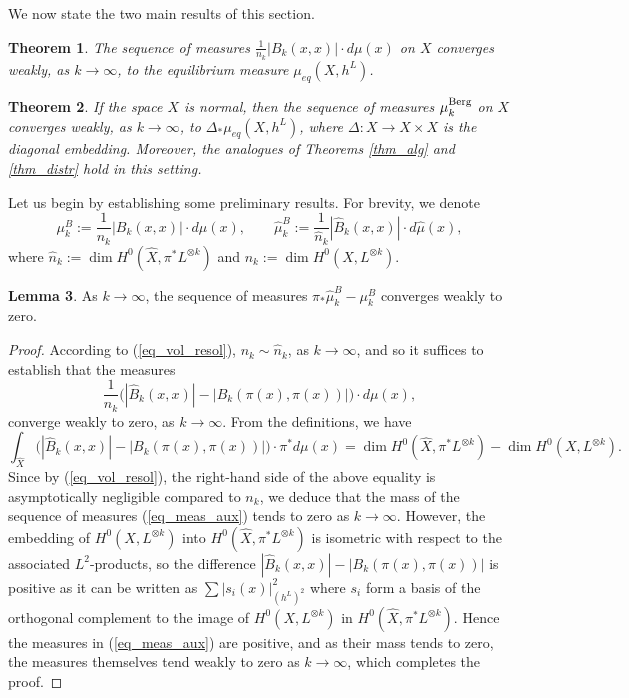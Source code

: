 \documentclass[12pt]{article}
\numberwithin{equation}{section}
\theoremstyle{theorem}
\newtheorem{thm}{Theorem}[section]
\theoremstyle{definition}
\newtheorem{lem}[thm]{Lemma}
\theoremstyle{remark}
\begin{document}
	We now state the two main results of this section.
	\par 
	\begin{thm}\label{thm_sing0}
		The sequence of measures $\frac{1}{n_k} |B_k(x, x)| \cdot d \mu(x)$ on $X$ converges weakly, as $k \to \infty$, to the equilibrium measure $\mu_{eq}(X, h^L)$.
	\end{thm}
	\begin{thm}\label{thm_sing}
		If the space $X$ is normal, then the sequence of measures $\mu_k^{\rm{Berg}}$ on $X$ converges weakly, as $k \to \infty$, to $\Delta_* \mu_{eq}(X, h^L)$, where $\Delta: X \to X \times X$ is the diagonal embedding.
		Moreover, the analogues of Theorems \ref{thm_alg} and \ref{thm_distr} hold in this setting.
	\end{thm}
	Let us begin by establishing some preliminary results.
	For brevity, we denote 
	\begin{equation}
		\mu_k^B := \frac{1}{n_k} |B_k(x, x)| \cdot d \mu(x), \qquad \hat{\mu}_k^B := \frac{1}{\hat{n}_k} |\hat{B}_k(x, x)| \cdot d \hat{\mu}(x),
	\end{equation}
	where $\hat{n}_k := \dim H^0(\hat{X}, \pi^* L^{\otimes k})$ and $n_k := \dim H^0(X, L^{\otimes k})$.
	\begin{lem}\label{lem_comp_res_meas}
		As $k \to \infty$, the sequence of measures $\pi_* \hat{\mu}_k^B - \mu_k^B$ converges weakly to zero.
	\end{lem}
	\begin{proof}
		According to (\ref{eq_vol_resol}), $n_k \sim \hat{n}_k$, as $k \to \infty$, and so it suffices to establish that the measures
		\begin{equation}\label{eq_meas_aux}
			\frac{1}{n_k} \Big( |\hat{B}_k(x, x)| - |B_k(\pi(x), \pi(x))| \Big) \cdot d \mu(x),
		\end{equation}
		converge weakly to zero, as $k \to \infty$.
		From the definitions, we have 
		\begin{equation}
			\int_{\hat{X}}  \Big( |\hat{B}_k(x, x)| - |B_k(\pi(x), \pi(x))| \Big) \cdot \pi^* d \mu(x)
			=
			\dim H^0(\hat{X}, \pi^* L^{\otimes k})
			-
			\dim H^0(X, L^{\otimes k}).
		\end{equation}
		Since by (\ref{eq_vol_resol}), the right-hand side of the above equality is asymptotically negligible compared to $n_k$, we deduce that the mass of the sequence of measures (\ref{eq_meas_aux}) tends to zero as $k \to \infty$.  
		However, the embedding of $H^0(X, L^{\otimes k})$ into $H^0(\hat{X}, \pi^* L^{\otimes k})$ is isometric with respect to the associated $L^2$-products, so the difference $|\hat{B}_k(x, x)| - |B_k(\pi(x), \pi(x))|$ is positive as it can be written as $\sum |s_i(x)|^2_{(h^L)^2}$ where $s_i$ form a basis of the orthogonal complement to the image of $H^0(X, L^{\otimes k})$ in $H^0(\hat{X}, \pi^* L^{\otimes k})$. 
		Hence the measures in (\ref{eq_meas_aux}) are positive, and as their mass tends to zero, the measures themselves tend weakly to zero as $k \to \infty$, which completes the proof.
	\end{proof}
\end{document}
